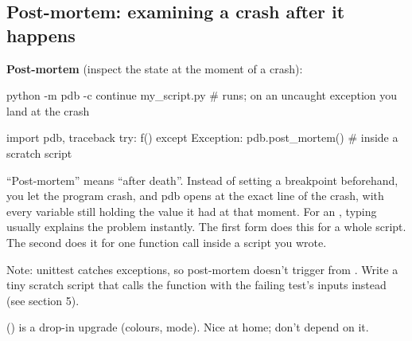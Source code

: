 \documentclass[10pt,a4paper]{article}
\begin{document}
\subsection{Post-mortem: examining a crash after it happens}
\textbf{Post-mortem} (inspect the state at the moment of a crash):
\begin{shcode}
python -m pdb -c continue my_script.py      # runs; on an uncaught exception you land at the crash
\end{shcode}
\begin{pycode}
import pdb, traceback
try:
    f()
except Exception:
    pdb.post_mortem()                        # inside a scratch script
\end{pycode}
“Post-mortem” means “after death”. Instead of setting a breakpoint beforehand, you let the program crash, and pdb opens at the exact line of the crash, with every variable still holding the value it had at that moment. For an , typing  usually explains the problem instantly. The first form does this for a whole script. The second does it for one function call inside a script you wrote.
\begin{notebox}
Note: unittest catches exceptions, so post-mortem doesn’t trigger from . Write a tiny scratch script that calls the function with the failing test’s inputs instead (see section 5).
\end{notebox}
 () is a drop-in upgrade (colours,  mode). Nice at home; don’t depend on it.
\setcounter{section}{3}
\end{document}
